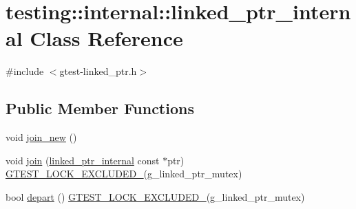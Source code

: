 \hypertarget{classtesting_1_1internal_1_1linked__ptr__internal}{\section{testing\+:\+:internal\+:\+:linked\+\_\+ptr\+\_\+internal Class Reference}
\label{classtesting_1_1internal_1_1linked__ptr__internal}
}


{\ttfamily \#include $<$gtest-\/linked\+\_\+ptr.\+h$>$}

\subsection*{Public Member Functions}
\begin{DoxyCompactItemize}
\item 
void \hyperlink{classtesting_1_1internal_1_1linked__ptr__internal_a742af1f65df2d5e2b7198a1b74264a83}{join\+\_\+new} ()
\item 
void \hyperlink{classtesting_1_1internal_1_1linked__ptr__internal_acd5a341459f7e81b10b4112d8c764e2a}{join} (\hyperlink{classtesting_1_1internal_1_1linked__ptr__internal}{linked\+\_\+ptr\+\_\+internal} const $\ast$ptr) \hyperlink{gtest-port_8h_a69abff5a4efdd07bd5faebe3dd318d06}{G\+T\+E\+S\+T\+\_\+\+L\+O\+C\+K\+\_\+\+E\+X\+C\+L\+U\+D\+E\+D\+\_\+}(g\+\_\+linked\+\_\+ptr\+\_\+mutex)
\item 
bool \hyperlink{classtesting_1_1internal_1_1linked__ptr__internal_a8699e539d9702d363ef0351012d1b3ca}{depart} () \hyperlink{gtest-port_8h_a69abff5a4efdd07bd5faebe3dd318d06}{G\+T\+E\+S\+T\+\_\+\+L\+O\+C\+K\+\_\+\+E\+X\+C\+L\+U\+D\+E\+D\+\_\+}(g\+\_\+linked\+\_\+ptr\+\_\+mutex)
\end{DoxyCompactItemize}


